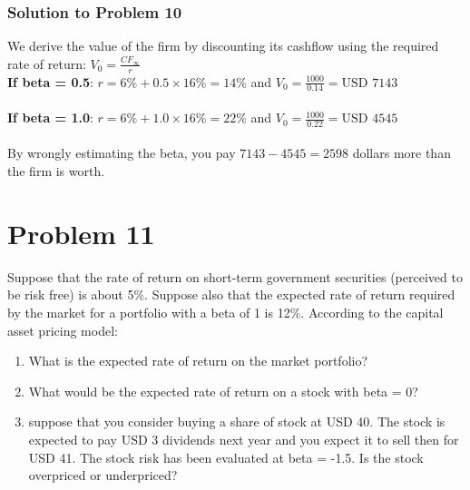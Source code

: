 \documentclass[12]{article}
\begin{document}
\color{blue}
\subsubsection*{Solution to Problem 10}
We derive the value of the firm by discounting its cashflow using the required rate of return: $V_0 = \frac{CF_\infty}{r}$\\
\textbf{If beta = 0.5}: $r= 6\% + 0.5\times 16\% = 14\%$ and $V_0 = \frac{1000}{0.14} = \text{USD } 7143$\\
\\
\textbf{If beta = 1.0}: $r= 6\% + 1.0\times 16\% = 22\%$ and $V_0 = \frac{1000}{0.22} = \text{USD } 4545$\\
\\
By wrongly estimating the beta, you pay $7143 - 4545 = 2598$ dollars more than the firm is worth.




\color{black}
\section*{Problem 11}
Suppose that the rate of return on short-term government securities (perceived to be risk free) is about 5\%. Suppose also that the expected rate of return required by the market for a portfolio with a beta of 1 is 12\%. According to the capital asset pricing model:
\begin{enumerate}
    \item[a)] What is the expected rate of return on the market portfolio?
    \item[b)] What would be the expected rate of return on a stock with beta = 0?
    \item[c)] suppose that you consider buying  a share of stock at USD 40. The stock is expected to pay USD 3 dividends next year and you expect it to sell then for USD 41. The stock risk has been evaluated at beta = -1.5. Is the stock overpriced or underpriced? 
\end{enumerate}



\color{blue}
\end{document}
